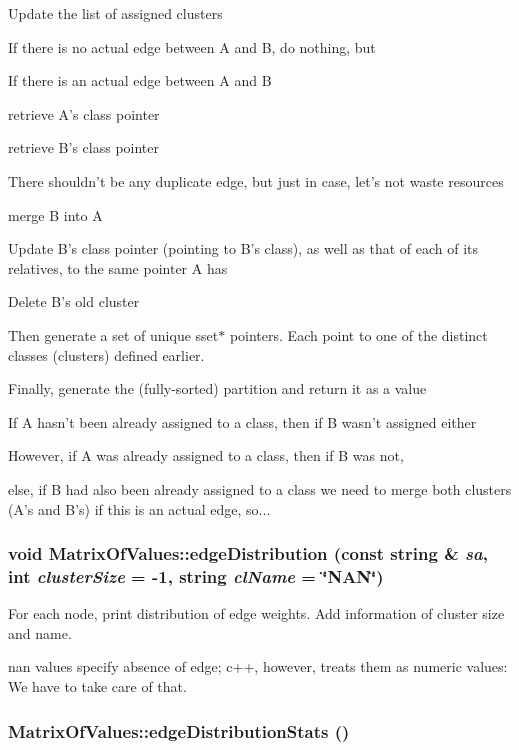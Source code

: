 Update the list of assigned clusters

If there is no actual edge between A and B, do nothing, but

If there is an actual edge between A and B

retrieve A's class pointer

retrieve B's class pointer

There shouldn't be any duplicate edge, but just in case, let's not waste resources

merge B into A

Update B's class pointer (pointing to B's class), as well as that of each of its relatives, to the same pointer A has

Delete B's old cluster

Then generate a set of unique sset$\ast$ pointers. Each point to one of the distinct classes (clusters) defined earlier.

Finally, generate the (fully-sorted) partition and return it as a value

If A hasn't been already assigned to a class, then if B wasn't assigned either

However, if A was already assigned to a class, then if B was not,

else, if B had also been already assigned to a class we need to merge both clusters (A's and B's) if this is an actual edge, so...
\subsubsection{\setlength{\rightskip}{0pt plus 5cm}void Matrix\-Of\-Values::edge\-Distribution (const string \& {\em sa}, int {\em cluster\-Size} = -1, string {\em cl\-Name} = \char`\"{}NAN\char`\"{})}\label{classMatrixOfValues_a27}


For each node, print distribution of edge weights. Add information of cluster size and name. 

nan values specify absence of edge; c++, however, treats them as numeric values: We have to take care of that. 
\subsubsection{ Matrix\-Of\-Values::edge\-Distribution\-Stats ()}\label{classMatrixOfValues_a29}



